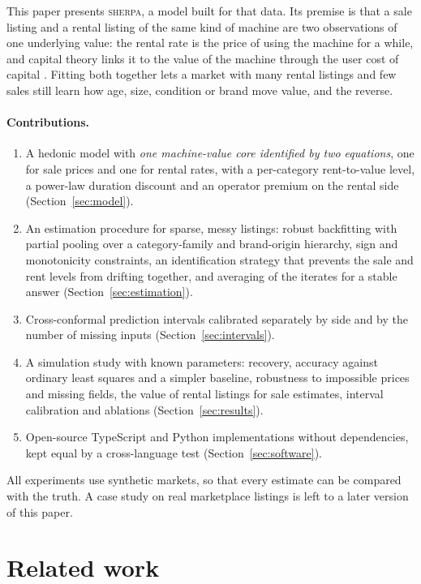 \documentclass[11pt]{article}
\newcommand{\sherpa}{\textsc{sherpa}}
\begin{document}
This paper presents \sherpa, a model built for that data. Its premise is that a sale listing and a
rental listing of the same kind of machine are two observations of one underlying value: the
rental rate is the price of using the machine for a while, and capital theory links it to the value
of the machine through the user cost of capital \citep{jorgenson1963,hall1967}. Fitting both
together lets a market with many rental listings and few sales still learn how age, size, condition
or brand move value, and the reverse.

\paragraph{Contributions.}
\begin{enumerate}
  \item A hedonic model with \emph{one machine-value core identified by two equations}, one for sale
  prices and one for rental rates, with a per-category rent-to-value level, a power-law duration
  discount and an operator premium on the rental side (Section~\ref{sec:model}).
  \item An estimation procedure for sparse, messy listings: robust backfitting with partial pooling
  over a category-family and brand-origin hierarchy, sign and monotonicity constraints, an
  identification strategy that prevents the sale and rent levels from drifting together, and
  averaging of the iterates for a stable answer (Section~\ref{sec:estimation}).
  \item Cross-conformal prediction intervals calibrated separately by side and by the number of
  missing inputs (Section~\ref{sec:intervals}).
  \item A simulation study with known parameters: recovery, accuracy against ordinary least
  squares and a simpler baseline, robustness to impossible prices and missing fields, the value of
  rental listings for sale estimates, interval calibration and ablations (Section~\ref{sec:results}).
  \item Open-source TypeScript and Python implementations without dependencies, kept equal by a
  cross-language test (Section~\ref{sec:software}).
\end{enumerate}

All experiments use synthetic markets, so that every estimate can be compared with the truth. A
case study on real marketplace listings is left to a later version of this paper.

\section{Related work}
\label{sec:related}
\end{document}
